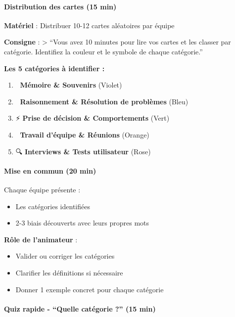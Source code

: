\documentclass[
]{article}
\providecommand{\tightlist}{%
  \setlength{\itemsep}{0pt}\setlength{\parskip}{0pt}}
\begin{document}
\paragraph{Distribution des cartes (15
min)}\label{distribution-des-cartes-15-min}

\textbf{Matériel} : Distribuer 10-12 cartes aléatoires par équipe

\textbf{Consigne} : \textgreater{} ``Vous avez 10 minutes pour lire vos
cartes et les classer par catégorie. Identifiez la couleur et le symbole
de chaque catégorie.''

\textbf{Les 5 catégories à identifier :}

\begin{enumerate}
\def\labelenumi{\arabic{enumi}.}
\tightlist
\item
  🧠 \textbf{Mémoire \& Souvenirs} (Violet)
\item
  🤔 \textbf{Raisonnement \& Résolution de problèmes} (Bleu)
\item
  ⚡ \textbf{Prise de décision \& Comportements} (Vert)
\item
  👥 \textbf{Travail d'équipe \& Réunions} (Orange)
\item
  🔍 \textbf{Interviews \& Tests utilisateur} (Rose)
\end{enumerate}

\paragraph{Mise en commun (20 min)}\label{mise-en-commun-20-min}

Chaque équipe présente :

\begin{itemize}
\tightlist
\item
  Les catégories identifiées
\item
  2-3 biais découverts avec leurs propres mots
\end{itemize}

\textbf{Rôle de l'animateur} :

\begin{itemize}
\tightlist
\item
  Valider ou corriger les catégories
\item
  Clarifier les définitions si nécessaire
\item
  Donner 1 exemple concret pour chaque catégorie
\end{itemize}

\paragraph{Quiz rapide - ``Quelle catégorie ?'' (15
min)}\label{quiz-rapide---quelle-catuxe9gorie-15-min}
\end{document}
